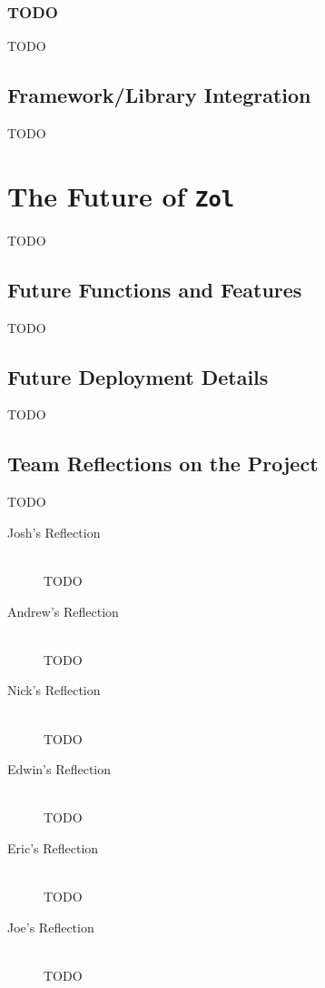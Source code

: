 \documentclass{article}
\newcommand{\projectname}[0] {\texttt{Zol} }
\begin{document}
			\subsubsection{TODO}
			TODO

		\subsection{Framework/Library Integration}
		TODO

	\section[Future Plans]{The Future of \projectname}
	\label{sec:future}
	TODO

		\subsection[Features]{Future Functions and Features}
		TODO

		\subsection[Deployment]{Future Deployment Details}
		TODO

		\subsection[Personal Reflections]{Team Reflections on the Project}
		TODO

		\begin{description}
			\item[Josh's Reflection] \hfill \\
			TODO

			\item[Andrew's Reflection] \hfill \\
			TODO

			\item[Nick's Reflection] \hfill \\
			TODO

			\item[Edwin's Reflection] \hfill \\
			TODO

			\item[Eric's Reflection] \hfill \\
			TODO

			\item[Joe's Reflection] \hfill \\
			TODO
		\end{description}
\end{document}

